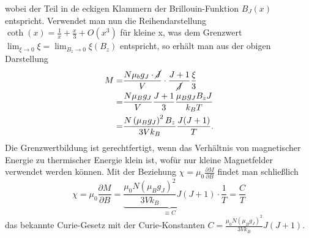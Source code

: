 \documentclass[twoside,colorback,accentcolor=tud4c,11pt]{tudreport}
\begin{document}
wobei der Teil in de eckigen Klammern der Brillouin-Funktion $B_{J}(x)$ entspricht. Verwendet man nun die Reihendarstellung $\coth (x)=\frac{1}{x}+\frac{x}{3}+O(x^3)$ für kleine x, was dem Grenzwert $\lim_{\xi\to0}\xi=\lim_{B_{z}\to 0}\xi (B_{z})$ entspricht, so erhält man aus der obigen Darstellung
\begin{align}
M=&\frac{N\mu_{b}g_{J}\cdot \cancel{J}}{V}\cdot\frac{J+1}{\cancel{J}}\frac{\xi}{3}\\
=&\frac{N\mu_{B}g_{J}}{V}\frac{J+1}{3}\frac{\mu_{B}g_{J}B_{z}J}{k_{B}T}\\
=&\frac{N\left(\mu_{B}g_{J}\right)^2B_{z}}{3Vk_{B}}\frac{J(J+1)}{T}.
\end{align}
Die Grenzwertbildung ist gerechtfertigt, wenn das Verhältnis von magnetischer Energie zu thermischer Energie klein ist, wofür nur kleine Magnetfelder verwendet werden können. 
Mit der Beziehung $\chi=\mu_{0}\frac{\partial M}{\partial B}$ findet man schließlich
\begin{equation}\label{eq:curie}
\chi=\mu_{0}\frac{\partial M}{\partial B}=\underbrace{\frac{\mu_{0}N\left(\mu_{B}g_{J}\right)^2}{3Vk_{B}}J(J+1)}_{\equiv C}\cdot\frac{1}{T}=\frac{C}{T}
\end{equation}
das bekannte Curie-Gesetz mit der Curie-Konstanten $C=\frac{\mu_{0}N\left(\mu_{B}g_{J}\right)^2}{3Vk_{B}}J(J+1)$.
\end{document}
